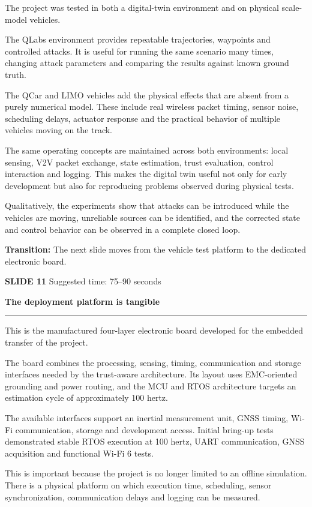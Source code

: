 \documentclass[11pt,a4paper]{article}
\newcommand{\slidetitle}[3]{%
  \clearpage
  {\color{Accent}\large\bfseries SLIDE #1}\hfill
  {\color{Muted}\small Suggested time: #3}\par
  \vspace{0.18cm}
  {\LARGE\bfseries #2}\par
  \vspace{0.20cm}
  {\color{Muted}\rule{\textwidth}{0.5pt}}\par
  \vspace{0.12cm}
}
\newcommand{\transition}[1]{%
  \vfill
  \colorbox{Panel}{%
    \parbox{\dimexpr\textwidth-2\fboxsep\relax}{%
      \raggedright\textbf{Transition:} #1}}
}
\begin{document}
The project was tested in both a digital-twin environment and on physical scale-model vehicles.

The QLabs environment provides repeatable trajectories, waypoints and controlled attacks. It is useful for running the same scenario many times, changing attack parameters and comparing the results against known ground truth.

The QCar and LIMO vehicles add the physical effects that are absent from a purely numerical model. These include real wireless packet timing, sensor noise, scheduling delays, actuator response and the practical behavior of multiple vehicles moving on the track.

The same operating concepts are maintained across both environments: local sensing, V2V packet exchange, state estimation, trust evaluation, control interaction and logging. This makes the digital twin useful not only for early development but also for reproducing problems observed during physical tests.

Qualitatively, the experiments show that attacks can be introduced while the vehicles are moving, unreliable sources can be identified, and the corrected state and control behavior can be observed in a complete closed loop.

\transition{The next slide moves from the vehicle test platform to the dedicated electronic board.}

\slidetitle{11}{The deployment platform is tangible}{75--90 seconds}

This is the manufactured four-layer electronic board developed for the embedded transfer of the project.

The board combines the processing, sensing, timing, communication and storage interfaces needed by the trust-aware architecture. Its layout uses EMC-oriented grounding and power routing, and the MCU and RTOS architecture targets an estimation cycle of approximately 100 hertz.

The available interfaces support an inertial measurement unit, GNSS timing, Wi-Fi communication, storage and development access. Initial bring-up tests demonstrated stable RTOS execution at 100 hertz, UART communication, GNSS acquisition and functional Wi-Fi 6 tests.

This is important because the project is no longer limited to an offline simulation. There is a physical platform on which execution time, scheduling, sensor synchronization, communication delays and logging can be measured.
\end{document}
